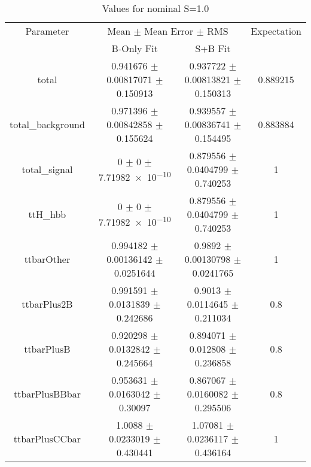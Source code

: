\begin{table}
\centering
\caption{Values for nominal S=1.0}
\begin{tabular}{cccc}
\toprule
Parameter & \multicolumn{2}{c}{Mean $\pm$ Mean Error $\pm$ RMS} & Expectation\\
 & B-Only Fit & S+B Fit & \\
\midrule
total & \num{0.941676} $\pm$ \num{0.00817071} $\pm$ \num{0.150913} & \num{0.937722} $\pm$ \num{0.00813821} $\pm$ \num{0.150313} & \num{0.889215}\\
total\_background & \num{0.971396} $\pm$ \num{0.00842858} $\pm$ \num{0.155624} & \num{0.939557} $\pm$ \num{0.00836741} $\pm$ \num{0.154495} & \num{0.883884}\\
total\_signal & \num{0} $\pm$ \num{0} $\pm$ \num{7.71982e-10} & \num{0.879556} $\pm$ \num{0.0404799} $\pm$ \num{0.740253} & \num{1}\\
ttH\_hbb & \num{0} $\pm$ \num{0} $\pm$ \num{7.71982e-10} & \num{0.879556} $\pm$ \num{0.0404799} $\pm$ \num{0.740253} & \num{1}\\
ttbarOther & \num{0.994182} $\pm$ \num{0.00136142} $\pm$ \num{0.0251644} & \num{0.9892} $\pm$ \num{0.00130798} $\pm$ \num{0.0241765} & \num{1}\\
ttbarPlus2B & \num{0.991591} $\pm$ \num{0.0131839} $\pm$ \num{0.242686} & \num{0.9013} $\pm$ \num{0.0114645} $\pm$ \num{0.211034} & \num{0.8}\\
ttbarPlusB & \num{0.920298} $\pm$ \num{0.0132842} $\pm$ \num{0.245664} & \num{0.894071} $\pm$ \num{0.012808} $\pm$ \num{0.236858} & \num{0.8}\\
ttbarPlusBBbar & \num{0.953631} $\pm$ \num{0.0163042} $\pm$ \num{0.30097} & \num{0.867067} $\pm$ \num{0.0160082} $\pm$ \num{0.295506} & \num{0.8}\\
ttbarPlusCCbar & \num{1.0088} $\pm$ \num{0.0233019} $\pm$ \num{0.430441} & \num{1.07081} $\pm$ \num{0.0236117} $\pm$ \num{0.436164} & \num{1}\\
\bottomrule
\end{tabular}
\end{table}